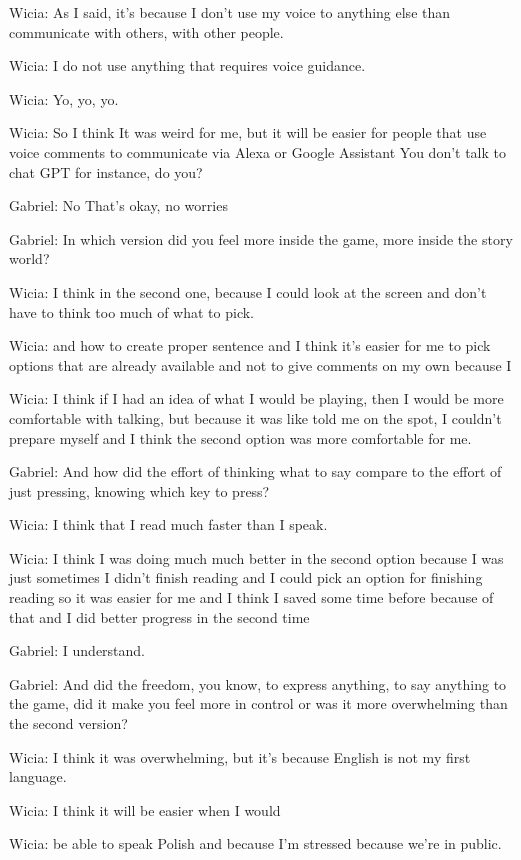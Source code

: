 Wicia: As I said, it's because I don't use my voice to anything else than communicate with others, with other people.

Wicia: I do not use anything that requires voice guidance.

Wicia: Yo, yo, yo.

Wicia: So I think It was weird for me, but it will be easier for people that use voice comments to communicate via Alexa or Google Assistant You don't talk to chat GPT for instance, do you?

Gabriel: No That's okay, no worries

Gabriel: In which version did you feel more inside the game, more inside the story world?

Wicia: I think in the second one, because I could look at the screen and don't have to think too much of what to pick.

Wicia: and how to create proper sentence and I think it's easier for me to pick options that are already available and not to give comments on my own because I

Wicia: I think if I had an idea of what I would be playing, then I would be more comfortable with talking, but because it was like told me on the spot, I couldn't prepare myself and I think the second option was more comfortable for me.

Gabriel: And how did the effort of thinking what to say compare to the effort of just pressing, knowing which key to press?

Wicia: I think that I read much faster than I speak.

Wicia: I think I was doing much much better in the second option because I was just sometimes I didn't finish reading and I could pick an option for finishing reading so it was easier for me and I think I saved some time before because of that and I did better progress in the second time

Gabriel: I understand.

Gabriel: And did the freedom, you know, to express anything, to say anything to the game, did it make you feel more in control or was it more overwhelming than the second version?

Wicia: I think it was overwhelming, but it's because English is not my first language.

Wicia: I think it will be easier when I would

Wicia: be able to speak Polish and because I'm stressed because we're in public.

